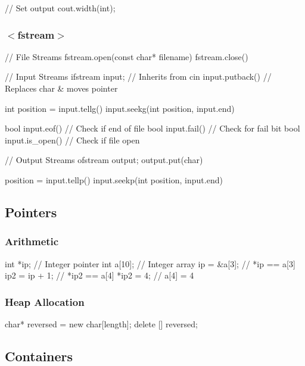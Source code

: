 \documentclass[10pt,a4paper]{extarticle}
\begin{document}
\begin{multicols}{2}
\begin{cppcode}
  // Set output
  cout.width(int);
\end{cppcode}

\subsubsection*{\color{airforceblue}$<$fstream$>$}
\begin{cppcode}
  // File Streams
  fstream.open(const char* filename)
  fstream.close()

  // Input Streams
  ifstream input; // Inherits from cin
  input.putback() // Replaces char & moves pointer

  int position = input.tellg()
  input.seekg(int position, input.end)

  bool input.eof()      // Check if end of file
  bool input.fail()     // Check for fail bit
  bool input.is_open()  // Check if file open
  
  // Output Streams
  ofstream output;
  output.put(char)

  position = input.tellp()
  input.seekp(int position, input.end)
\end{cppcode}

\vfill
\columnbreak

\subsection*{Pointers}

\subsubsection*{Arithmetic}
\begin{cppcode}
  int *ip;      // Integer pointer
  int a[10];    // Integer array
  ip = &a[3];   // *ip == a[3]
  ip2 = ip + 1; // *ip2 == a[4]
  *ip2 = 4;     // a[4] = 4
\end{cppcode}

\subsubsection*{Heap Allocation}
\begin{cppcode}
  char* reversed = new char[length];
  delete [] reversed;
\end{cppcode}

\subsection*{Containers}


\end{multicols}
\end{document}
